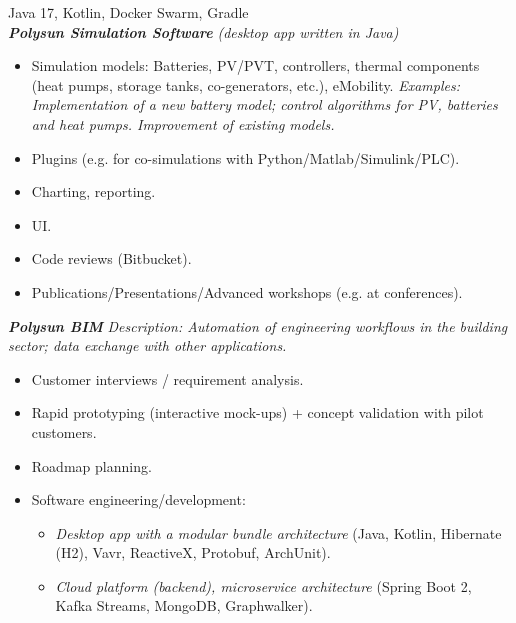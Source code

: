\documentclass[11pt,a4paper,ngerman,sans]{moderncv}
\begin{document}
{
  Java 17, Kotlin, Docker Swarm, Gradle\newline
  \\
	\textbf{\emph{Polysun Simulation Software}} \emph{(desktop app written in Java)}
  \begin{itemize}
    \item Simulation models: Batteries, PV/PVT, controllers, thermal components\newline
      (heat pumps, storage tanks, co-generators, etc.), eMobility.\newline
      \emph{
       Examples: Implementation of a new battery model;\newline
       control algorithms for PV, batteries and heat pumps.\newline
       Improvement of existing models.
      }
    \item Plugins (e.g. for co-simulations with Python/Matlab/Simulink/PLC).
    \item Charting, reporting.
    \item UI.
    \item Code reviews (Bitbucket).
    \item Publications/Presentations/Advanced workshops (e.g. at conferences).
      \\
  \end{itemize}
	\textbf{\emph{Polysun BIM}} 
	\emph{Description: Automation of engineering workflows in the building sector;\newline
	data exchange with other applications.}\newline
  \begin{itemize}
    \item Customer interviews / requirement analysis.
    \item Rapid prototyping (interactive mock-ups) + concept validation with pilot customers.
    \item Roadmap planning.
    \item Software engineering/development:
      \begin{itemize}
        \item \emph{Desktop app with a modular bundle architecture}\newline
          (Java, Kotlin, Hibernate (H2), Vavr, ReactiveX, Protobuf, ArchUnit).
        \item \emph{Cloud platform (backend), microservice architecture}\newline
          (Spring Boot 2, Kafka Streams, MongoDB, Graphwalker).

\end{itemize}
\end{itemize}}
\end{document}
